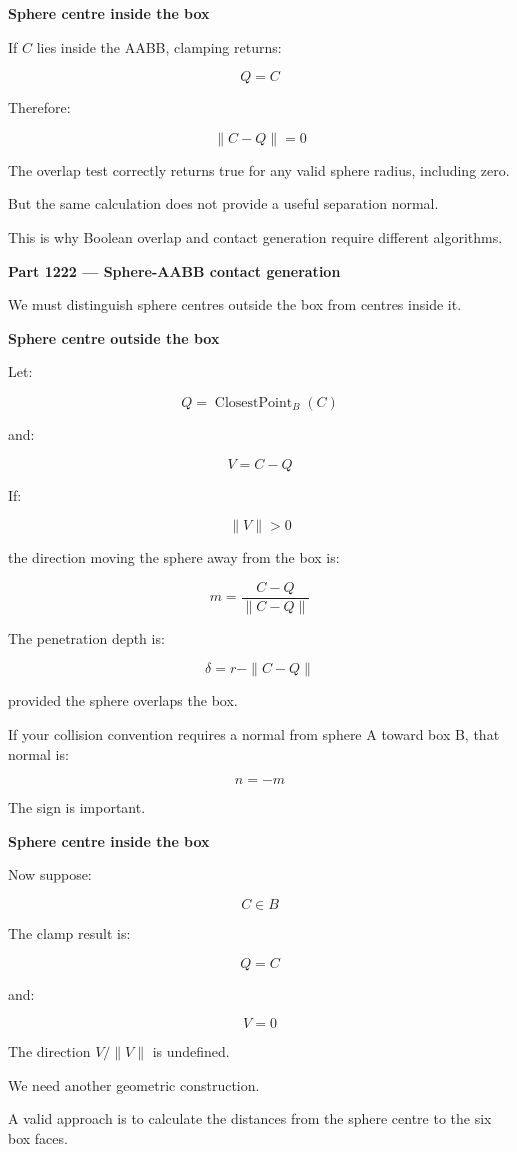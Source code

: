 \textbf{Sphere centre inside the box}

If \(C\) lies inside the AABB, clamping returns:

\[
Q=C
\]

Therefore:

\[
\|C-Q\|=0
\]

The overlap test correctly returns true for any valid sphere radius, including zero.

But the same calculation does not provide a useful separation normal.

This is why Boolean overlap and contact generation require different algorithms.

\textbf{Part 1222 --- Sphere-AABB contact generation}

We must distinguish sphere centres outside the box from centres inside it.

\textbf{Sphere centre outside the box}

Let:

\[
Q=\operatorname{ClosestPoint}_{B}(C)
\]

and:

\[
V=C-Q
\]

If:

\[
\|V\|>0
\]

the direction moving the sphere away from the box is:

\[
\boxed{ m=\frac{C-Q}{\|C-Q\|} }
\]

The penetration depth is:

\[
\boxed{ \delta=r-\|C-Q\| }
\]

provided the sphere overlaps the box.

If your collision convention requires a normal from sphere A toward box B, that normal is:

\[
n=-m
\]

The sign is important.

\textbf{Sphere centre inside the box}

Now suppose:

\[
C\in B
\]

The clamp result is:

\[
Q=C
\]

and:

\[
V=0
\]

The direction \(V/\|V\|\) is undefined.

We need another geometric construction.

A valid approach is to calculate the distances from the sphere centre to the six box faces.

